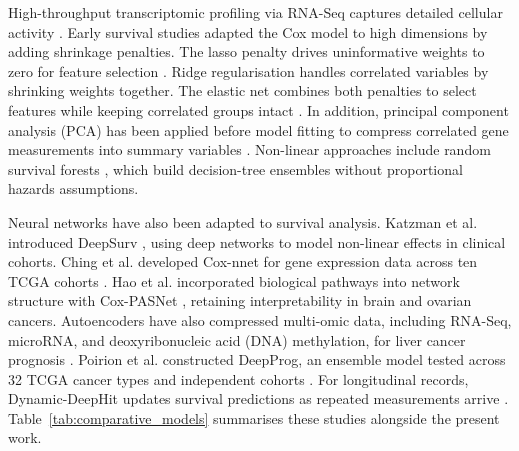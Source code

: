 \documentclass[10pt,a4paper]{article}
\begin{document}
High-throughput transcriptomic profiling via RNA-Seq captures detailed cellular activity \citep{li2011rsem}. Early survival studies adapted the Cox model to high dimensions by adding shrinkage penalties. The lasso penalty drives uninformative weights to zero for feature selection \citep{tibshirani1997lasso}. Ridge regularisation handles correlated variables by shrinking weights together. The elastic net combines both penalties to select features while keeping correlated groups intact \citep{zou2005regularization, wu2012elastic, simon2011regularization}. In addition, principal component analysis (PCA) has been applied before model fitting to compress correlated gene measurements into summary variables \citep{hotelling1933analysis, jolliffe2016principal, vanhouwelingen2006crossvalidated}. Non-linear approaches include random survival forests \citep{ishwaran2008random}, which build decision-tree ensembles without proportional hazards assumptions.

Neural networks have also been adapted to survival analysis. Katzman et al. introduced DeepSurv \citep{katzman2018deepsurv}, using deep networks to model non-linear effects in clinical cohorts. Ching et al. developed Cox-nnet for gene expression data across ten TCGA cohorts \citep{ching2018coxnnet}. Hao et al. incorporated biological pathways into network structure with Cox-PASNet \citep{hao2019coxpasnet}, retaining interpretability in brain and ovarian cancers. Autoencoders have also compressed multi-omic data, including RNA-Seq, microRNA, and deoxyribonucleic acid (DNA) methylation, for liver cancer prognosis \citep{chaudhary2018deep}. Poirion et al. constructed DeepProg, an ensemble model tested across 32 TCGA cancer types and independent cohorts \citep{poirion2021deepprog}. For longitudinal records, Dynamic-DeepHit updates survival predictions as repeated measurements arrive \citep{lee2020dynamic}. Table~\ref{tab:comparative_models} summarises these studies alongside the present work.
\end{document}
